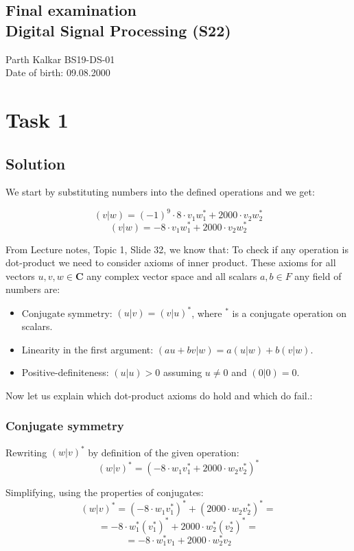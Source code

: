\documentclass[12pt,a4paper]{article}
\begin{document}
\begin{center}
    \section*{Final examination\\
    Digital Signal Processing (S22)\\}
    Parth Kalkar BS19-DS-01\\
    Date of birth: 09.08.2000\\
    
\end{center}

\section{Task 1}
\subsection{Solution}

We start by substituting numbers into the defined operations and we get:

$$(v|w)=(-1)^{9}\cdot8\cdot v_1w_1^*+2000\cdot v_2w_2^*$$
$$(v|w)=-8\cdot v_1w_1^*+2000\cdot v_2w_2^*$$

From Lecture notes, Topic 1, Slide 32, we know that: To check if any operation is dot-product we need to consider axioms of inner product. These axioms for all vectors $u,v,w \in \pmb{C}$  any complex vector space and all scalars $a,b\in F$ any field of numbers are:
\begin{itemize}
    \item Conjugate symmetry: $(u|v) = (v|u)^*$, where $^*$ is a conjugate
operation on scalars.
    \item Linearity in the first argument: $(au+bv|w) = a(u|w)+b(v|w)$.
    \item Positive-definiteness: $(u|u) > 0$ assuming $u\neq 0$ and $(0|0) = 0$.
\end{itemize}


Now let us explain which dot-product axioms do hold and which do fail.:
\subsubsection{Conjugate symmetry}
    
    Rewriting $(w|v)^*$ by definition of the given operation:
    $$(w|v)^*=(-8\cdot w_1v_1^*+2000\cdot w_2v_2^*)^*$$
    
    Simplifying, using the properties of conjugates:
    $$(w|v)^*=(-8\cdot w_1v_1^*)^*+(2000\cdot w_2v_2^*)^*=$$
    $$=-8\cdot w_1^*(v_1^*)^*+2000\cdot w_2^*(v_2^*)^*=$$
    $$=-8\cdot w_1^*v_1+2000\cdot w_2^*v_2$$
    
\end{document}
